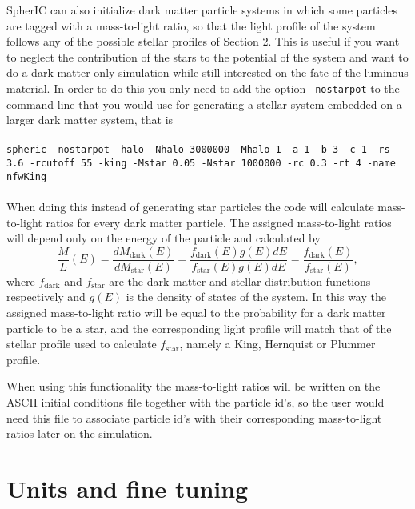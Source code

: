 \documentclass[letterpaper,10pt]{article}
\begin{document}
SpherIC can also initialize dark matter particle systems in which some particles are tagged with a mass-to-light ratio, so that the light profile of the system follows any of the possible stellar profiles of Section 2. This is useful if you want to neglect the contribution of the stars to the potential of the system and want to do a dark matter-only simulation while still interested on the fate of the luminous material. In order to do this you only need to add the option \texttt{-nostarpot} to the command line that you would use for generating a stellar system embedded on a larger dark matter system, that is
\\
\\
\texttt{spheric -nostarpot -halo -Nhalo 3000000 -Mhalo 1 -a 1 -b 3 -c 1 -rs 3.6 -rcutoff 55 -king -Mstar 0.05 -Nstar 1000000 -rc 0.3 -rt 4 -name nfwKing}\\
\\
 When doing this instead of generating star particles the code will calculate mass-to-light ratios for every dark matter particle. The assigned mass-to-light ratios will depend only on the energy of the particle and calculated by
\begin{equation} \label{mtoleq}
\frac{M}{L}(E) = \frac{dM_{\mathrm{dark}}(E)}{dM_{\mathrm{star}}(E)} = \frac{f_{\mathrm{dark}}(E)g(E)dE}{f_{\mathrm{star}}(E)g(E)dE} = \frac{f_{\mathrm{dark}}(E)}{f_{\mathrm{star}}(E)},
\end{equation}
where $f_{\mathrm{dark}}$ and $f_{\mathrm{star}}$ are the dark matter and stellar distribution functions respectively and $g(E)$ is the density of states of the system. In this way the assigned mass-to-light ratio will be equal to the probability for a dark matter particle to be a star, and the corresponding light profile will match that of the stellar profile used to calculate $f_{\mathrm{star}}$, namely a King, Hernquist or Plummer profile.

When using this functionality the mass-to-light ratios will be written on the ASCII initial conditions file together with the particle id's, so the user would need this file to associate particle id's with their corresponding mass-to-light ratios later on the simulation. 

\section{Units and fine tuning}
\end{document}
